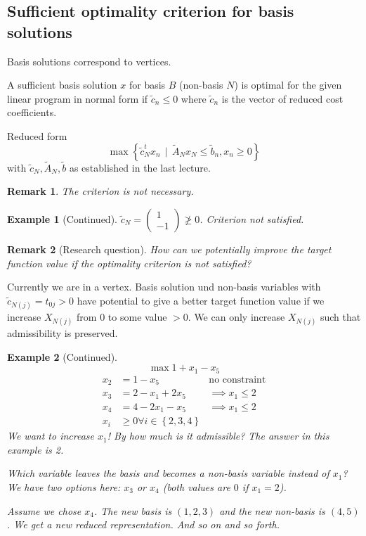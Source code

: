 \documentclass[a4paper]{article}
\numberwithin{lecref}{subsection}
\newtheorem*{Example}{Example}
\newtheorem*{Remark}{Remark}
\newcommand{\Set}[1]{\left\{#1\right\}}
\newcommand{\SetDef}[2]{\left\{#1\,\mid\,#2\right\}}
\begin{document}
\subsection{Sufficient optimality criterion for basis solutions}

Basis solutions correspond to vertices.

A sufficient basis solution $x$ for basis $B$ (non-basis $N$) is optimal for the given linear program in normal form
if $\tilde c_n \leq 0$ where $\tilde c_n$ is the vector of reduced cost coefficients.

\begin{mdframed}
	Reduced form
	\[ \max\SetDef{\tilde c_N^t x_n}{\tilde A_N x_N \leq \tilde b_n, x_n \geq 0} \]
	with $\tilde c_N, \tilde A_N, \tilde b$ as established in the last lecture.
\end{mdframed}

\begin{Remark}
	The criterion is not necessary.
\end{Remark}

\begin{Example}[Continued]
	$\tilde c_N = \begin{pmatrix} 1 \\ -1 \end{pmatrix} \not\geq 0$. Criterion not satisfied.
\end{Example}

\begin{Remark}[Research question]
	How can we potentially improve the target function value if the optimality criterion is not satisfied?
\end{Remark}

Currently we are in a vertex. Basis solution und non-basis variables with $\tilde c_{N(j)} = t_{0j} > 0$ have potential to give a better target function value if we increase $X_{N(j)}$ from 0 to some value $>0$.
We can only increase $X_{N(j)}$ such that admissibility is preserved.

\begin{Example}[Continued]
	\[ \max 1 + x_1 - x_5 \]
	\begin{align*}
		x_2 &= 1 - x_5 & \text{no constraint} \\
		x_3 &= 2 - x_1 + 2x_5 & \implies x_1 \leq 2 \\
		x_4 &= 4 - 2x_1 - x_5 & \implies x_1 \leq 2 \\
		x_i &\geq 0 \forall i \in \Set{2, 3, 4}
	\end{align*}
	We want to increase $x_1$! By how much is it admissible? The answer in this example is 2.

	Which variable leaves the basis and becomes a non-basis variable instead of $x_1$?
	We have two options here: $x_3$ or $x_4$ (both values are $0$ if $x_1 = 2$).

	Assume we chose $x_4$. The new basis is $(1, 2, 3)$ and the new non-basis is $(4,5)$. We get a new reduced representation. And so on and so forth.
\end{Example}
\end{document}
